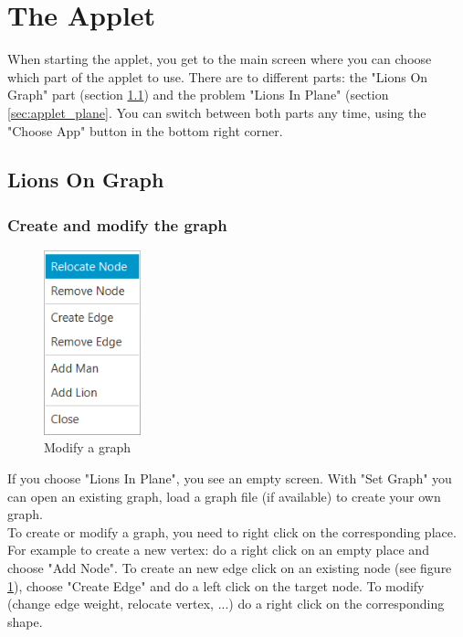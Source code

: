 \documentclass[a4paper]{article}
\begin{document}
\section{The Applet}
When starting the applet, you get to the main screen where you can choose which part of the applet to use. There are to different parts: the "Lions On Graph" part (section \ref{sec:applet_graph}) and the problem "Lions In Plane" (section \ref{sec:applet_plane}. You can switch between both parts any time, using the "Choose App" button in the bottom right corner.

\subsection{Lions On Graph}\label{sec:applet_graph}

\subsubsection*{Create and modify the graph}

\begin{figure}
  \vspace{-20pt}
  \begin{center}
    \includegraphics[width=0.25\textwidth]{modify.png}
  \end{center}
  \vspace{-20pt}
  \caption{Modify a graph}
  \label{fig:modify}
  \vspace{-10pt}
\end{figure}
If you choose "Lions In Plane", you see an empty screen. With "Set Graph" you can open an existing graph, load a graph file (if available) to create your own graph. \\
To create or modify a graph, you need to right click on the corresponding place. For example to create a new vertex: do a right click on an empty place and choose "Add Node". To create an new edge click on an existing node (see figure \ref{fig:modify}), choose "Create Edge" and do a left click on the target node. To modify (change edge weight, relocate vertex, ...) do a right click on the corresponding shape.\\
\end{document}

